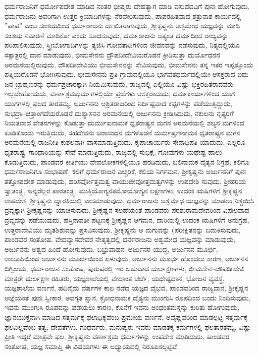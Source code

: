 ಧರ್ಮರಾಜನಿಗೆ ಧರ್ಮೋಪದೇಶ ಮಾಡಿದ ನಂತರ ಭೀಷ್ಮರು ದೇಹತ್ಯಾಗ ಮಾಡಿ ವಸುಪದವಿಗೆ ಪುನಃ ಹೋಗುವುದು, ಧರ್ಮರಾಜನು ಅವರಿಗಾಗಿ ಉತ್ತರ ಕ್ರಿಯಾದಿಗಳನ್ನು ನೆರವೇರಿಸುವುದು, ಪಾಪರಹಿತವಾದ ಶತ್ರುನಾಶ ಕಾರ್ಯದಲ್ಲಿ ”ಪಾಪ” ಎಂಬ ಸಂಶಯದಿಂದ ಧರ್ಮರಾಜನು ದುಃಖಿತನಾಗುವುದು, ಶ‍್ರೀಕೃಷ್ಣನು ಅಶ್ವಮೇಧ ಯಜ್ಞವನ್ನು ಮಾಡಿ ಸಂಶಯ ನಿವಾರಣೆ ಮಾಡಿಕೋ ಎಂದು ಸೂಚಿಸುವುದು, ಧರ್ಮರಾಜನು ಅತ್ಯಂತ ಧರ್ಮದಿಂದ ರಾಜ್ಯವನ್ನು ಪರಿಪಾಲಿಸುವುದು, ಸ್ತ್ರೀಬೋಗಾದಿಗಳನ್ನು ತ್ಯಜಿಸಿ ಗೋವತಾದಿಗಳಿಂದ ಜೀವನವನ್ನು ನಡೆಸುವುದು, ನಿತ್ಯದಲ್ಲಿಯೂ ಸತ್ಪಾತ್ರರಲ್ಲಿ ದಾನ ಮಾಡುವುದು, ಭೀಮಸೇನನು ದ್ರೌಪದೀದೇವಿಯರೊಡನೆ ಕ್ರೀಡಿಸುತ್ತಾ ದುರ್ಯೊಧನನ ಅರಮನೆಯಲ್ಲಿರುವುದು, ದೌಪದೀದೇವಿಯು ಭೀಮಸೇನನನ್ನು ಸೇವಿಸುವುದು, ಭೀಮಸೇನನು ತನ್ನ ಇತರ ಇಪ್ಪತ್ತೊಂದು ಪತ್ನಿಯರೊಡನೆ ಭೋಗಿಸುವುದು, ಭೀಮಸೇನನು ಪ್ರತಿ ಗ್ರಾಮದಲ್ಲಿಯೂ ಭಾಗವತಧರ್ಮದಲ್ಲಿಯೇ ಆಸಕ್ತರಾದ ಐದು ಜನ ಬ್ರಾಹ್ಮಣರನ್ನು ಧರ್ಮಪ್ರಚಾರಕ್ಕಾಗಿ ನಿಯಮಿಸುವುದು, ರಾಜ್ಯದಲ್ಲಿ ಎಲ್ಲಿಯೂ ವಿಷ್ಣು ಭಕ್ತಿರಹಿತರಾದವರು ಇಲ್ಲದೇಹೋದುದು, ವರ್ಣಾಶ್ರಮಧರ್ಮಗಳಲ್ಲಿಯೇ ಪ್ರಜೆಗಳು ಆಸಕ್ತರಾದುದು, ಧರ್ಮಕಾರ್ಯಗಳಿಂದ ಯುಗ ಯುಗಗಳಲ್ಲಿ ಫಲದ ತಾರತಮ್ಯ, ಅರ್ಜುನನು ಆಶ್ರಿತರಾಜರಿಂದ ನಿರ್ದಿಷ್ಟವಾದ ಕಪ್ಪಗಳನ್ನು ಪಡೆಯುತ್ತಿದ್ದುದು, ಸುಭದ್ರಾ–ಚಿತ್ರಾಂಗದೆಯರೊಡನೆ ದುಶ್ಯಾಸನನ ಅರಮನೆಯಲ್ಲಿ ಅರ್ಜುನನು ಕ್ರೀಡಿಸಿದುದು, ನಕುಲನು ನೃತ್ಯರಿಗೆ ನಿಯತವಾದ ವೇತನಗಳನ್ನು ಕೊಡುತ್ತಾ ದುರ್ಮುಖನಾಮಕ ಧೃತರಾಷ್ಟ್ರನ ಮಗನ ಅರಮನೆಯಲ್ಲಿ ಶಲ್ಯನ ಮಗಳಿಂದ ಕೂಡಿಕೊಂಡು ಇರುತ್ತಿದುದು, ಸಹದೇವನು ಜರಾಸಂಧನ ಮಗಳೊಡನೆ ದುರ್ಮಷ್ರಣನಾಮಕ ಧೃತರಾಷ್ಟ್ರನ ಮಗನ ಅರಮನೆಯಲ್ಲಿ ರಾಜನೀತಿ ಕುಶಲನಾಗಿ ವಾಸಮಾಡುತ್ತಿದುದು, ಕೃಪಾಚಾರ್ಯರು ಸೇನಾಧಿಪತಿ ಯಾದುದು, ಎಲ್ಲರೂ ಧೃತರಾಷ್ಟ್ರ–ಗಾಂಧಾರಿಯನ್ನು ಸೇವೆ ಮಾಡುತ್ತಿದುದು, ರಾಜ್ಯದಲ್ಲಿ ಸುಭಿಕ್ಷೆ, ಗೋವುಗಳು ಯಥೇಷ್ಟ ಹಾಲು ಕೊಡುತ್ತಿದುದು, ಪಾಂಡವರ ಕೀರ್ತಿಯು ದೇವಲೋಕಗಳಲ್ಲಿಯೂ ಹರಡಿದುದು, ಬಲಿನಾಮಕ ದೈತ್ಯನ ನಿಗ್ರಹ, ಕಲಿಗೂ ಧರ್ಮರಾಜನಿಗೂ ಸಂಭಾಷಣೆ, ಕಲಿಗೆ ಧರ್ಮರಾಜನ ಎಚ್ಚರಿಕೆ, ಕಲಿಯ ನಿರ್ಗಮನ, ಶ‍್ರೀಕೃಷ್ಣನು ಅರ್ಜುನನಿಗೆ ಪುನಃ ತತ್ತೋಪದೇಶ ಮಾಡುವುದು, ಹರಿಸರ್ವೋತ್ತಮತ್ವ ವಾಯುಜೀವೋತ್ತಮತ್ವಗಳನ್ನು ಉಪದೇಶಿ ಸುವುದು, ಶ‍್ರೀಹರಿಯ ಸ್ವಾತಂತ್ರ್ಯ, ಅನ್ಯರೆಲ್ಲರ ಪಾರತಂತ್ರ್ಯ, ಮುಕ್ತಿಯೋಗ್ಯನತಮೋಯೋಗ್ಯನ ಲಕ್ಷಣಗಳು, ಉದಂಕ ಋಷಿಗಳಿಗೆ ಶ‍್ರೀಕೃಷ್ಣನ ಉಪದೇಶ, ಶ‍್ರೀಕೃಷ್ಣನು ದ್ವಾರಕಿಯಲ್ಲಿ ವಾಸಮಾಡುವುದು, ಧರ್ಮರಾಜನು ಅಶ್ವಮೇಧ ಯಜ್ಞವನ್ನು ಮಾಡಲು ನಿಶ್ಚಯಿಸಿ ದ್ರವ್ಯಕ್ಕಾಗಿ ಶ‍್ರೀಕೃಷ್ಣನನ್ನು ಯಾಚಿಸುವುದು, ಶ‍್ರೀಕೃಷ್ಣನ ಸಲಹೆಯಂತೆ ಪಾಂಡವರು ಪರಶುರಾಮದೇವರಿಂದ ವಿಪುಲವಾದ ದ್ರವ್ಯವನ್ನು ಪಡೆಯುವುದು, ಹಸ್ತಿನಾವತೀ ಪಟ್ಟಣಕ್ಕೆ ಶ‍್ರೀಕೃಷ್ಣನ ಆಗಮನ, ದಾರಿಯಲ್ಲಿ ಉದಂಕ ಋಷಿಗಳಿಗೆ ಅನುಗ್ರಹ, ಉತ್ತರಾದೇವಿಯು ಮೃತಶಿಶುವನ್ನು ಪ್ರಸವಿಸುವುದು, ಶ‍್ರೀಕೃಷ್ಣನು ಆ ಮಗುವನ್ನು (ಪರೀಕ್ಷಿತನನ್ನು ಬದುಕಿಸುವುದು, ಪಾಂಡವರ ಸಂತೋಷ, ವೇದವ್ಯಾಸದೇವರ ನೇತೃತ್ವದಲ್ಲಿ ಧನ೯ರಾಜನು ಅಶ್ವಮೇಧ ಯಜ್ಞವನ್ನು ಮಾಡುವುದು, ಅರ್ಜುನನು ಅಶ್ವದ ಹಿಂದೆ ಹೋಗುವುದು, ಬಭ್ರುವಾಹನ–ಅರ್ಜುನರ ಯುದ್ಧ, ಅರ್ಜುನನ ಮೂರ್ಛ, ಉಲೂಪಿಯಿಂದ ಅರ್ಜುನನು ಮೂರ್ಛಯಿಂದ ಏಳುವುದು, ಅರ್ಜುನನು ಮೂರ್ಛ ಹೊಂದಲು ಕಾರಣ, ಅರ್ಜುನನ ದಿಗ್ವಿಜಯ, ಧರ್ಮರಾಜನ ಸಂತೋಷ, ಪುರುಷರಲ್ಲಿ ಇರ ಬಹುದಾದ ದುರ್ಲಕ್ಷಣಗಳು, ಭೀಮಸೇನ–ದೌಪದೀದೇವಿ ಮಾತ್ರರೇ ದುರ್ಲಕ್ಷಣ ರಹಿತರು, ಯಜ್ಞಶಾಲೆಯಲ್ಲಿ ವೇದಾಂತ ಚರ್ಚೆ, ಯಥೇಷ್ಟದಾನ, ಭೋಜನ ವ್ಯವಸ್ಥೆ, ಯಜ್ಞಶಾಲೆಯ ವರ್ಣನೆ, ಹದಿನೈದು ವರ್ಷಗಳ ಕಾಲ ನಡೆದ ಯಜ್ಞದ ವೈಭವ, ಪಾಂಡವರಿಂದ ರಾಜ್ಯದಾನ, ಶ‍್ರೀಕೃಷ್ಣನ ಆಜ್ಞೆಯಂತೆ ಪುನಃ ಸ್ವೀಕಾರ, ಅವಗೃತ ಸ್ನಾನ, ಕ್ರೋಧನಾಮಕ ದೈತ್ಯನು ಮುಂಗುಸಿ ರೂಪದಿಂದ ಬಂದು ನಿಂದಿಸುವುದು, ಇವನು ಮುಂಗುಸಿ ರೂಪವನ್ನು ಪಡೆಯಲು ಕಾರಣ, ಕೊನೆಗೆ ಇವನು ಅಂಧಂತಮಸ್ಸನ್ನು ಕುರಿತು ಹೋಗುವುದು, ಜ್ಞಾನಯುಕ್ತನಾಗಿ ಮಾಡಿದ ಸತ್ಕರ್ಮಕ್ಕೆ ಫಲಾಧಿಕ್ಯವೆಂಬ ಪ್ರಮೇಯ ವರ್ಣನೆ, ಅವೈಷ್ಣವರಿಂದ ಮಾಡಲ್ಪಟ್ಟ ಸತ್ಕರ್ಮಕ್ಕೆ ಫಲವಿಲ್ಲವೆಂಬ ತತ್ವ; ದೇವತೆಗಳು, ಗಂಧರ್ವರು, ಮನುಷ್ಯರು ಇವರು ಮಾಡತಕ್ಕ ಕರ್ಮಗಳಲ್ಲಿ ಫಲತಾರತಮ್ಯ, ವಿಷ್ಣು ಪ್ರೀತಿ ಇದ್ದರೆ ಮಾತ್ರವೇ ಫಲ, ಶ‍್ರೀಕೃಷ್ಣನು ವರ್ಣಾಶ್ರಮ ಧರ್ಮಗಳನ್ನು ಉಪದೇಶ ಮಾಡಿದುದು, ಪಾಂಡವರ ಸಂತೋಷ, ಯಜ್ಞ ಸಮಾಪ್ತಿ ಈ ವಿಷಯಗಳು ಈ ಅಧ್ಯಾಯದಲ್ಲಿ ನಿರೂಪಿಸಲ್ಪಟ್ಟಿವೆ.


